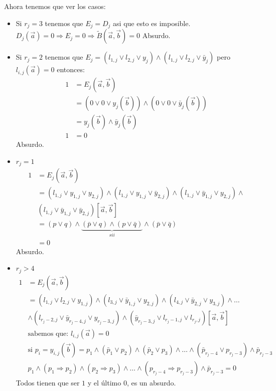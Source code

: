 \documentclass[12pt,a4paper]{article}
\begin{document}
Ahora tenemos que ver los casos:
\begin{itemize}
    \item Si $r_{j} = 3$ tenemos que $E_{j} = D_{j}$ asi que esto es imposible.
        $D_{j}(\overrightarrow{a}) = 0 \Rightarrow E_{j} = 0 \Rightarrow \widetilde{B}(\overrightarrow{a},\overrightarrow{b}) = 0$
        Absurdo.
    \item Si $r_{j} = 2$ tenemos que 
        $E_{j} = (l_{1,j} \vee l_{2,j} \vee y_{j}) \wedge (l_{1,j} \vee l_{2,j} \vee \bar{y}_{j})$
        pero $l_{i,j}(\overrightarrow{a}) = 0$ entonces:
        \begin{align*}
            1 &= E_{j}(\overrightarrow{a},\overrightarrow{b}) \\
            &= (0 \vee 0 \vee y_{j}(\overrightarrow{b})) \wedge (0 \vee 0 \vee \bar{y}_{j}(\overrightarrow{b}))\\
            &= y_{j}(\overrightarrow{b}) \wedge \bar{y}_{j}(\overrightarrow{b})\\
            1 &= 0
        \end{align*}
        Absurdo.
    \item $r_{j} =1$
        \begin{align*}
            1 &= E_{j}(\overrightarrow{a},\overrightarrow{b}) \\
            &=(l_{1,j} \vee y_{1,j} \vee y_{2,j}) \wedge (l_{1,j} \vee y_{1,j} \vee \bar{y}_{2,j}) \wedge (l_{1,j} \vee \bar{y}_{1,j} \vee y_{2,j}) \wedge \\ 
            &(l_{1,j} \vee \bar{y}_{1,j} \vee \bar{y}_{2,j})[\overrightarrow{a},\overrightarrow{b}]\\
            &=(p \vee q) \wedge \underbrace{(\bar{p} \vee q) \wedge (p \vee \bar{q})}_{sii} \wedge (\bar{p} \vee \bar{q}) \\
            &=0
        \end{align*}
        Absurdo.
    \item $r_{j} > 4$
        \begin{align*}
            1 &= E_{j}(\overrightarrow{a},\overrightarrow{b}) \\
            &= (l_{1,j} \vee l_{2,j} \vee y_{1,j}) \wedge (l_{3,j} \vee \bar{y}_{1,j} \vee y_{2,j}) \wedge (l_{4,j} \vee \bar{y}_{2,j} \vee y_{3,j}) \wedge \ldots \\ 
            &\wedge (l_{r_{j}-2,j} \vee \bar{y}_{r_{j}-4,j} \vee y_{r_{j}-3,j}) \wedge (\bar{y}_{r_{j}-3,j} \vee l_{r_{j}-1,j} \vee l_{r_{j},j})[\overrightarrow{a},\overrightarrow{b}]\\
            & \text{sabemos que:}\,\, l_{i,j}(\overrightarrow{a}) = 0\\
            & \text{si}\,\, p_{i} = y_{i,j}(\overrightarrow{b}) = p_{1} \wedge (\bar{p}_{1} \vee p_{2}) \wedge (\bar{p}_{2} \vee p_{3}) \wedge \ldots \wedge (\bar{p}_{r_{j}-4} \vee p_{r_{j}-3}) \wedge \bar{p}_{r_{j}-3}\\
            & p_{1} \wedge (p_{1} \Rightarrow p_{2}) \wedge (p_{2} \Rightarrow p_{3}) \wedge \ldots \wedge (p_{r_{j}-4} \Rightarrow p_{r_{j}-3}) \wedge \bar{p}_{r_{j}-3} =0
        \end{align*}
        Todos tienen que ser $1$ y el último $0$, es un absurdo.
\end{itemize}
\end{document}
